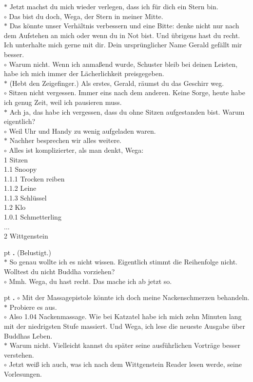 \documentclass[10pt,a4paper]{article}
\newcounter{notec}
\newcommand\notep[1]{%
  \stepcounter{notec}
  \vskip #1pt
  {\bf\arabic{notec}.}
}
\begin{document}
\begin{mdframed}[style=daystyle]
  \vskip 2pt
  $\ast$ Jetzt machst du mich wieder verlegen, dass ich für dich ein Stern bin. \\
  $\circ$ Das bist du doch, Wega, der Stern in meiner Mitte. \\
  $\ast$ Das könnte unser Verhältnis verbessern und eine Bitte: denke nicht nur
  nach dem Aufstehen an mich oder wenn du in Not bist. Und übrigens hast du
  recht. Ich unterhalte mich gerne mit dir. Dein ursprünglicher Name Gerald
  gefällt mir besser. \\
  $\circ$ Warum nicht. Wenn ich anmaßend wurde, Schuster bleib bei deinen
  Leisten, habe ich mich immer der Lächerlichkeit preisgegeben. \\
  $\ast$ (Hebt den Zeigefinger.) Als erstes, Gerald, räumst du das Geschirr weg. \\
  $\circ$ Sitzen nicht vergessen. Immer eins nach dem anderen. Keine Sorge,
  heute habe ich genug Zeit, weil ich pausieren muss. \\
  $\ast$ Ach ja, das habe ich vergessen, dass du ohne Sitzen aufgestanden bist.
  Warum eigentlich? \\
  $\circ$ Weil Uhr und Handy zu wenig aufgeladen waren. \\
  $\ast$ Nachher besprechen wir alles weitere. \\
  $\circ$ Alles ist komplizierter, als man denkt, Wega: \\
  1 Sitzen \\
  1.1 Snoopy \\
  1.1.1 Trocken reiben \\
  1.1.2 Leine \\
  1.1.3 Schlüssel \\
  1.2 Klo \\
  1.0.1 Schmetterling \\
  $\ldots$ \\
  2 Wittgenstein

  \notep 4 (Belustigt.) \\
  $\ast$ So genau wollte ich es nicht wissen. Eigentlich stimmt die Reihenfolge
  nicht. Wolltest du nicht Buddha vorziehen? \\
  $\circ$ Mmh. Wega, du hast recht. Das mache ich ab jetzt so.

  \notep 4 $\circ$ Mit der Massagepistole könnte ich doch meine Nackenschmerzen
  behandeln. \\
  $\ast$ Probiere es aus. \\
  $\circ$ Also 1.04 Nackenmassage. Wie bei Katzatel habe ich mich zehn Minuten
  lang mit der niedrigsten Stufe massiert. Und Wega, ich lese die neueste
  Ausgabe über Buddhas Leben. \\
  $\ast$ Warum nicht. Vielleicht kannst du später seine ausführlichen
  Vorträge besser verstehen. \\
  $\circ$ Jetzt weiß ich auch, was ich nach dem Wittgenstein Reader lesen werde,
  seine Vorlesungen.


\end{mdframed}
\end{document}
